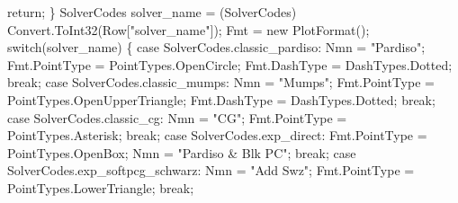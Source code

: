 {\btab \btab \btab \btab return;\newline 
\btab \btab    \}\newline 
 \newline 
\btab \btab    SolverCodes solver\_name = (SolverCodes) Convert.ToInt32(Row["solver\_name"]);\newline 
\btab \btab    Fmt                     = new PlotFormat();\newline 
\btab \btab    switch(solver\_name) \{\newline 
\btab \btab    case SolverCodes.classic\_pardiso: \newline 
\btab \btab \btab    Nmn           = "Pardiso"; \newline 
\btab \btab \btab    Fmt.PointType = PointTypes.OpenCircle;\newline 
\btab \btab \btab    Fmt.DashType  = DashTypes.Dotted;\newline 
\btab \btab \btab    break;\newline 
\btab \btab    case SolverCodes.classic\_mumps: \newline 
\btab \btab \btab    Nmn           = "Mumps"; \newline 
\btab \btab \btab    Fmt.PointType = PointTypes.OpenUpperTriangle;\newline 
\btab \btab \btab    Fmt.DashType  = DashTypes.Dotted;\newline 
\btab \btab \btab    break;\newline 
\btab \btab    case SolverCodes.classic\_cg: \newline 
\btab \btab \btab    Nmn           = "CG"; \newline 
\btab \btab \btab    Fmt.PointType = PointTypes.Asterisk;\newline 
\btab \btab \btab    break;\newline 
\btab \btab    case SolverCodes.exp\_direct: \newline 
\btab \btab \btab    Fmt.PointType = PointTypes.OpenBox;\newline 
\btab \btab \btab    Nmn           = "Pardiso & Blk PC"; \newline 
\btab \btab \btab    break;\newline 
\btab \btab    case SolverCodes.exp\_softpcg\_schwarz: \newline 
\btab \btab \btab    Nmn           = "Add Swz"; \newline 
\btab \btab \btab    Fmt.PointType = PointTypes.LowerTriangle;\newline 
\btab \btab \btab    break;\newline 
}
